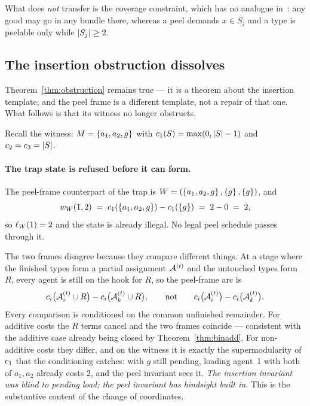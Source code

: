 What does \emph{not} transfer is the coverage constraint, which has no analogue
in~\cite{BKNS22}: any good may go in any bundle there, whereas a peel demands
$x \in S_j$ and a type is peelable only while $\left\lvert S_j\right\rvert \ge 2$.

\subsection{The insertion obstruction dissolves}
\label{sec:dissolve}

Theorem~\ref{thm:obstruction} remains true --- it is a theorem about the
insertion template, and the peel frame is a different template, not a repair of
that one. What follows is that its witness no longer obstructs.

Recall the witness: $M = \left\{a_1,a_2,g\right\}$ with $c_1(S) =
\max(0,\left\lvert S\right\rvert-1)$ and $c_2 = c_3 = \left\lvert S\right\rvert$.

\paragraph{The trap state is refused before it can form.}
The peel-frame counterpart of the trap is $W =
(\left\{a_1,a_2,g\right\}, \left\{g\right\}, \left\{g\right\})$, and
\[
  w_{W}(1,2) \;=\; c_1(\left\{a_1,a_2,g\right\}) - c_1(\left\{g\right\})
  \;=\; 2 - 0 \;=\; 2 ,
\]
so $\ell_{W}(1) = 2$ and the state is already illegal. No legal peel
schedule passes through it.

\begin{remark}
\label{rem:conditioned}
The two frames disagree because they compare different things. At a stage where
the finished types form a partial assignment $\mathcal{A}^{(t)}$ and the untouched
types form $R$, every agent is still on the hook for $R$, so the peel-frame arc
is
\[
  c_i\big(\mathcal{A}^{(t)}_i \cup R\big) - c_i\big(\mathcal{A}^{(t)}_k \cup R\big),
  \qquad\text{not}\qquad
  c_i\big(\mathcal{A}^{(t)}_i\big) - c_i\big(\mathcal{A}^{(t)}_k\big).
\]
Every comparison is conditioned on the common unfinished remainder. For additive
costs the $R$ terms cancel and the two frames coincide --- consistent with the
additive case already being closed by Theorem~\ref{thm:binadd}. For non-additive
costs they differ, and on the witness it is exactly the supermodularity of
$c_1$ that the conditioning catches: with $g$ still pending, loading agent~1
with both of $a_1,a_2$ already costs $2$, and the peel invariant sees it. \emph{The
insertion invariant was blind to pending load; the peel invariant has hindsight
built in.} This is the substantive content of the change of coordinates.
\end{remark}

